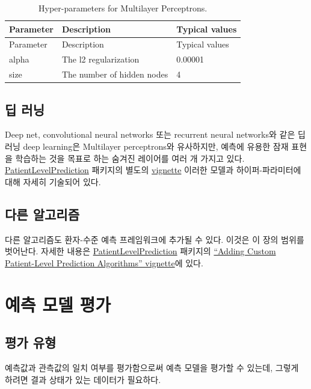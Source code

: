 \documentclass[10.5pt]{book}
\theoremstyle{definition}
\theoremstyle{definition}
\theoremstyle{definition}
\theoremstyle{remark}
\begin{document}
\begin{longtable}[]{@{}lll@{}}
\caption{\label{tab:mpParameters} Hyper-parameters for Multilayer
Perceptrons.}\tabularnewline
\toprule
Parameter & Description & Typical values\tabularnewline
\midrule
\endfirsthead
\toprule
Parameter & Description & Typical values\tabularnewline
\midrule
\endhead
alpha & The l2 regularization & 0.00001\tabularnewline
size & The number of hidden nodes & 4\tabularnewline
\bottomrule
\end{longtable}

\subsection{딥 러닝}\label{-}

Deep net, convolutional neural networks 또는 recurrent neural networks와
같은 딥 러닝 deep learning은 Multilayer perceptrons와 유사하지만, 예측에
유용한 잠재 표현을 학습하는 것을 목표로 하는 숨겨진 레이어를 여러 개
가지고 있다.
\href{https://ohdsi.github.io/PatientLevelPrediction/}{PatientLevelPrediction}
패키지의 별도의
\href{https://ohdsi.github.io/PatientLevelPrediction/articles/BuildingDeepLearningModels.html}{vignette}
이러한 모델과 하이퍼-파라미터에 대해 자세히 기술되어
있다. 

\subsection{다른 알고리즘}\label{-}

다른 알고리즘도 환자-수준 예측 프레임워크에 추가될 수 있다. 이것은 이
장의 범위를 벗어난다. 자세한 내용은
\href{https://ohdsi.github.io/PatientLevelPrediction/}{PatientLevelPrediction}
패키지의
\href{https://ohdsi.github.io/PatientLevelPrediction/articles/AddingCustomAlgorithms.html}{``Adding
Custom Patient-Level Prediction Algorithms'' vignette}에 있다.

\section{예측 모델 평가}\label{--}

\subsection{평가 유형}\label{-}

예측값과 관측값의 일치 여부를 평가함으로써 예측 모델을 평가할 수 있는데,
그렇게 하려면 결과 상태가 있는 데이터가 필요하다.
\end{document}
